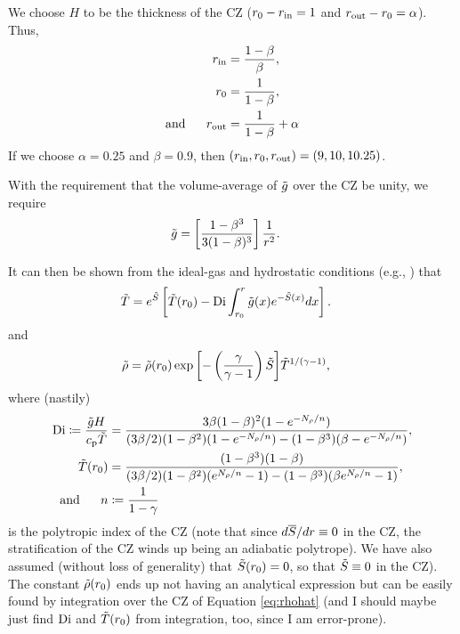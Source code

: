 \documentclass[12pt]{article}
\numberwithin{equation}{section}
\begin{document}
We choose $H$ to be the thickness of the CZ ($r_0-r_{\rm{in}}=1$ and $r_{\rm{out}}-r_0=\alpha$). Thus,
\begin{subequations}
	\begin{align}
		r_{\rm{in}} &=\frac{1-\beta}{\beta},\\
		r_0 &= \frac{1}{1-\beta},\\
		\text{and}\ \ \ \ \  r_{\rm{out}} &=  \frac{1}{1-\beta} + \alpha
	\end{align}
\end{subequations}
If we choose $\alpha=0.25$ and $\beta=0.9$, then $(r_{\rm{in}},r_0,r_{\rm{out}})=(9, 10, 10.25)$. 

With the requirement that the volume-average of $\tilde{g}$ over the CZ be unity, we require
\begin{align}
	\tilde{g} &= \left[ \frac{1-\beta^3}{3(1-\beta)^3}    \right]\frac{1}{r^2}.
\end{align}

It can then be shown from the ideal-gas and hydrostatic conditions (e.g., \citealt{Matilsky2023d}) that
\begin{align}\label{eq:tmphat}
	\tilde{T} &= e^{\tilde{S}}\left[\tilde{T}(r_0) - {\rm{Di}}\int_{r_0}^r \tilde{g}(x)  e^{-\tilde{S}(x)}dx\right].
\end{align}
and
\begin{align}\label{eq:rhohat}
	\tilde{\rho} &= \tilde{\rho}(r_0) \exp{\left[-\left(\frac{\gamma}{\gamma-1}\right)\tilde{S}\right]}\tilde{T}^{1/(\gamma-1)},
\end{align}
where (nastily)
\begin{align}\label{eq:digory}
	{\rm{Di}} \coloneqq \frac{\tilde{g}H}{c_{\rm{p}}\tilde{T}} &=  \frac{3 \beta (1 - \beta)^2 (1 - e^{-N_\rho/n})} 
	{ (3\beta/2) (1 - \beta^2) (1 - e^{-N_\rho/n}) - (1-\beta^3)(\beta-e^{-N_\rho/n})},\\
	\tilde{T}(r_0)&= \frac{(1-\beta^3)(1-\beta)}{(3\beta/2)(1-\beta^2)(e^{N_\rho/n}-1) - (1-\beta^3)(\beta e^{N_\rho/n}-1)},\\
	\text{and}\ \ \ \ \  n &\coloneqq \frac{1}{1-\gamma}
\end{align}
is the polytropic index of the CZ (note that since $d\overline{S}/dr\equiv0$ in the CZ, the stratification of the CZ winds up being an adiabatic polytrope). We have also assumed (without loss of generality) that $\tilde{S}(r_0)=0$, so that $\tilde{S}\equiv0$ in the CZ). The constant $\tilde{\rho}(r_0)$ ends up not having an analytical expression but can be easily found by integration over the CZ of Equation \eqref{eq:rhohat} (and I should maybe just find ${\rm{Di}}$ and $\tilde{T}(r_0)$ from integration, too, since I am error-prone).  
\end{document}
